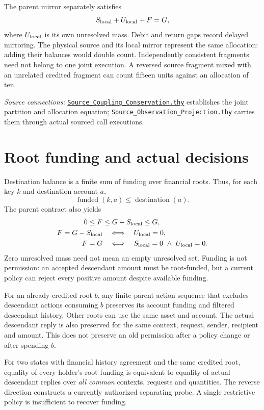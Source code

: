 \documentclass[10pt,a4paper]{article}
\newcommand{\source}[1]{\href{../#1}{\nolinkurl{#1}}}
\begin{document}
The parent mirror separately satisfies
\[
 S_{\rm local}+U_{\rm local}+F=G,
\]
where $U_{\rm local}$ is its own unresolved mass. Debit and return gaps record
delayed mirroring. The physical source and its local mirror represent the same
allocation: adding their balances would double count. Independently consistent
fragments need not belong to one joint execution. A reversed source fragment
mixed with an unrelated credited fragment can count fifteen units against an
allocation of ten.

\textit{Source connections:}
\source{Source_Coupling_Conservation.thy} establishes the joint partition and
allocation equation; \source{Source_Observation_Projection.thy} carries them
through actual sourced call executions.

\section*{Root funding and actual decisions}
Destination balance is a finite sum of funding over financial roots. Thus,
for each key $k$ and destination account $a$,
\[
  \operatorname{funded}(k,a)\leq\operatorname{destination}(a).
\]
The parent contract also yields
\begin{align*}
 0\leq F&\leq G-S_{\rm local}\leq G,\\
 F=G-S_{\rm local}&\quad\Longleftrightarrow\quad U_{\rm local}=0,\\
 F=G&\quad\Longleftrightarrow\quad
       S_{\rm local}=0\ \land\ U_{\rm local}=0.
\end{align*}
Zero unresolved mass need not mean an empty unresolved set. Funding is not
permission: an accepted descendant amount must be root-funded, but a current
policy can reject every positive amount despite available funding.

For an already credited root $b$, any finite parent action sequence that
excludes descendant actions consuming $b$ preserves its account funding and
filtered descendant history. Other roots can use the same asset and account.
The actual descendant reply is also preserved for the same context, request,
sender, recipient and amount. This does not preserve an old permission after
a policy change or after spending $b$.

For two states with financial history agreement and the same credited root,
equality of every holder's root funding is equivalent to equality of actual
descendant replies over \emph{all common} contexts, requests and quantities.
The reverse direction constructs a currently authorized separating probe.
A single restrictive policy is insufficient to recover funding.
\end{document}
